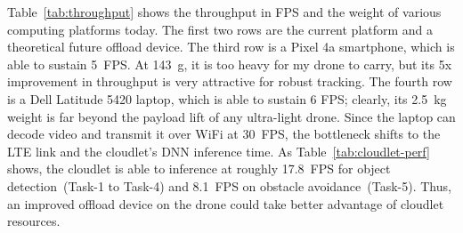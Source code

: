 Table~\ref{tab:throughput} shows the throughput in FPS and the weight
of various computing platforms today. The first two rows are the
current platform and a theoretical future offload device.  The third row is a Pixel 4a smartphone, which is able to sustain 5~FPS. At 143~g, it is too heavy
for my drone to carry, but its 5x improvement in throughput is very
attractive for robust tracking. The fourth row is a Dell Latitude 5420
laptop, which is able to sustain 6 FPS; clearly, its 2.5~kg weight is
far beyond the payload lift of any ultra-light drone.  Since the
laptop can decode video and transmit it over WiFi at 30~FPS, the
bottleneck shifts to the LTE link and the cloudlet's DNN inference
time.  As Table~\ref{tab:cloudlet-perf} shows, the cloudlet is able
to inference at roughly 17.8~FPS for object detection~(Task-1 to
Task-4) and 8.1~FPS on obstacle avoidance~(Task-5). Thus, an improved offload device on the drone could take better advantage of cloudlet resources.




